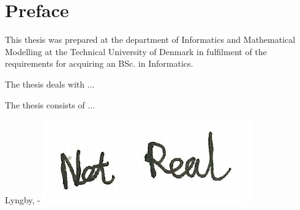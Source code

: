 \chapter{Preface}

This thesis was prepared at the department of Informatics and Mathematical Modelling at the Technical University of Denmark in fulfilment of the
requirements for acquiring an BSc. in Informatics. 

The thesis deals with ... 

The thesis consists of ...
\vspace{20mm}
\begin{center}
	\hspace{20mm} Lyngby, \thesishandin-\thesisyear 
	\vspace{5mm}
	\newline
	\includegraphics[scale=0.5]{figures/SignatureDummy}
\end{center}
\begin{flushright}
	\thesisauthor
\end{flushright}
